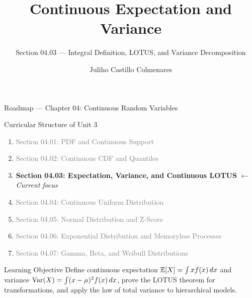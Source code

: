 \documentclass[aspectratio=169,xcolor={dvipsnames,table}]{beamer}
\title{Continuous Expectation and Variance}
\subtitle{Section 04.03 --- Integral Definition, LOTUS, and Variance Decomposition}
\author[J. Castillo Colmenares]{Juliho Castillo Colmenares}
\institute[Tec de Monterrey]{Tecnologico de Monterrey}
\date{\vspace{-1.5cm}}
\begin{document}
\begin{frame}[plain]
	\titlepage
\end{frame}

\begin{frame}{Roadmap --- Chapter 04: Continuous Random Variables}
	\vspace{-0.15cm}
	\begin{block}{Curricular Structure of Unit 3}
		\footnotesize
		\begin{enumerate}\itemsep=0.03cm
			\item \textcolor{gray}{Section 04.01: PDF and Continuous Support}
			\item \textcolor{gray}{Section 04.02: Continuous CDF and Quantiles}
			\item \textbf{\textcolor{TecRojo}{Section 04.03: Expectation, Variance, and Continuous LOTUS}} $\leftarrow$ \emph{Current focus}
			\item \textcolor{gray}{Section 04.04: Continuous Uniform Distribution}
			\item \textcolor{gray}{Section 04.05: Normal Distribution and Z-Score}
			\item \textcolor{gray}{Section 04.06: Exponential Distribution and Memoryless Processes}
			\item \textcolor{gray}{Section 04.07: Gamma, Beta, and Weibull Distributions}
		\end{enumerate}
	\end{block}
	\vspace{-0.2cm}
	\begin{alertblock}{Learning Objective}
		\scriptsize
		Define continuous expectation $\mathbb{E}[X] = \int x f(x)\,dx$ and variance $\operatorname{Var}(X) = \int (x-\mu)^{2} f(x)\,dx$, prove the LOTUS theorem for transformations, and apply the law of total variance to hierarchical models.
	\end{alertblock}
\end{frame}
\end{document}
